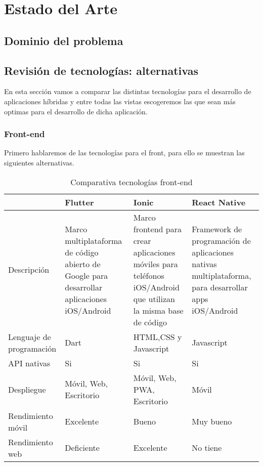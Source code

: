 \section{Estado del Arte}

\subsection{Dominio del problema}

\subsection{Revisión de tecnologías: alternativas}
En esta sección vamos a comparar las distintas tecnologías para el desarrollo de aplicaciones híbridas y entre todas las vistas escogeremos las que sean más optimas para el desarrollo de dicha aplicación.

\subsubsection{Front-end}
Primero hablaremos de las tecnologías para el front, para ello se muestran las siguientes alternativas.

\begin{table}[H] %
    \centering
    \begin{tabular}{|p{2cm} |p{4 cm} |p{4cm} |p{4cm} |} \hline 
         &  \textbf{Flutter}&  \textbf{Ionic}& \textbf{React Native}\\  \hline 
         Descripción &  Marco multiplataforma de código abierto de Google para desarrollar aplicaciones iOS/Android &  Marco frontend para crear aplicaciones móviles para teléfonos iOS/Android que utilizan la misma base de código& Framework de programación de aplicaciones nativas multiplataforma, para desarrollar apps iOS/Android\\ \hline 
         
        Lenguaje de programación &  Dart&  HTML,CSS y Javascript & Javascript\\ \hline 
        API nativas &  Si&  Si & Si\\ \hline 
        Despliegue &  Móvil, Web, Escritorio&  Móvil, Web, PWA, Escritorio & Móvil\\ \hline 
        Rendimiento móvil &  Excelente &  Bueno & Muy bueno\\ \hline 
        Rendimiento web &  Deficiente &  Excelente & No tiene\\ \hline 
    \end{tabular}
    \caption{Comparativa tecnologías front-end}
    \label{tab:tec_front}
\end{table}

